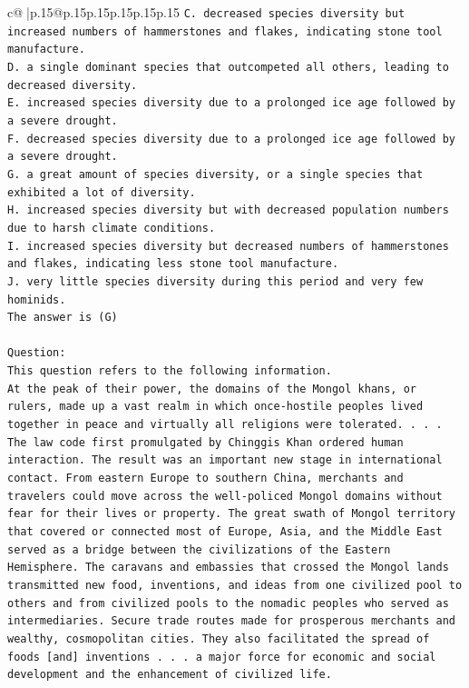 \documentclass{article}
\begin{document}
{\begin{supertabular}{c@{$\;$}|p{.15\linewidth}@{}p{.15\linewidth}p{.15\linewidth}p{.15\linewidth}p{.15\linewidth}p{.15\linewidth}}
{{{\texttt{C. decreased species diversity but increased numbers of hammerstones and flakes, indicating stone tool manufacture.} \\
\texttt{D. a single dominant species that outcompeted all others, leading to decreased diversity.} \\
\texttt{E. increased species diversity due to a prolonged ice age followed by a severe drought.} \\
\texttt{F. decreased species diversity due to a prolonged ice age followed by a severe drought.} \\
\texttt{G. a great amount of species diversity, or a single species that exhibited a lot of diversity.} \\
\texttt{H. increased species diversity but with decreased population numbers due to harsh climate conditions.} \\
\texttt{I. increased species diversity but decreased numbers of hammerstones and flakes, indicating less stone tool manufacture.} \\
\texttt{J. very little species diversity during this period and very few hominids.} \\
\texttt{The answer is (G)} \\
\\ 
\texttt{Question:} \\
\texttt{This question refers to the following information.} \\
\texttt{At the peak of their power, the domains of the Mongol khans, or rulers, made up a vast realm in which once{-}hostile peoples lived together in peace and virtually all religions were tolerated. . . . The law code first promulgated by Chinggis Khan ordered human interaction. The result was an important new stage in international contact. From eastern Europe to southern China, merchants and travelers could move across the well{-}policed Mongol domains without fear for their lives or property. The great swath of Mongol territory that covered or connected most of Europe, Asia, and the Middle East served as a bridge between the civilizations of the Eastern Hemisphere. The caravans and embassies that crossed the Mongol lands transmitted new food, inventions, and ideas from one civilized pool to others and from civilized pools to the nomadic peoples who served as intermediaries. Secure trade routes made for prosperous merchants and wealthy, cosmopolitan cities. They also facilitated the spread of foods {[}and{]} inventions . . . a major force for economic and social development and the enhancement of civilized life.} \\
}}}
\end{supertabular}}
\end{document}

